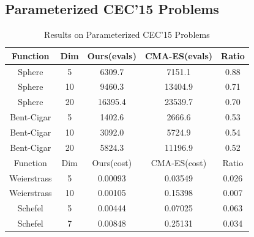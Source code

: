 


\subsection{Parameterized CEC'15 Problems}
\begin{table}
\center
{
\caption{Results on Parameterized CEC'15 Problems}
\begin{tabular}{| c c | c c | c|}
\hline
Function & Dim & Ours(evals) & CMA-ES(evals) & Ratio \\ \hline
Sphere & 5 & 6309.7 & 7151.1 & 0.88 \\ \hline
Sphere & 10 & 9460.3 & 13404.9 & 0.71 \\ \hline
Sphere & 20 & 16395.4 & 23539.7 & 0.70 \\ \hline
Bent-Cigar & 5 & 1402.6 & 2666.6 & 0.53 \\ \hline
Bent-Cigar & 10 & 3092.0 & 5724.9 & 0.54 \\ \hline
Bent-Cigar & 20 & 5824.3 & 11196.9 & 0.52 \\ \hline
\hline
Function & Dim & Ours(cost) & CMA-ES(cost) & Ratio \\ \hline
Weierstrass & 5 & 0.00093 & 0.03549 & 0.026 \\ \hline
Weierstrass & 10 & 0.00105 & 0.15398 & 0.007 \\ \hline
Schefel & 5 & 0.00444 & 0.07025 & 0.063 \\ \hline
Schefel & 7 & 0.00848 & 0.25131 & 0.034 \\ \hline
\end{tabular}
\label{tab:optskills_cec15_result}
}
\end{table}

